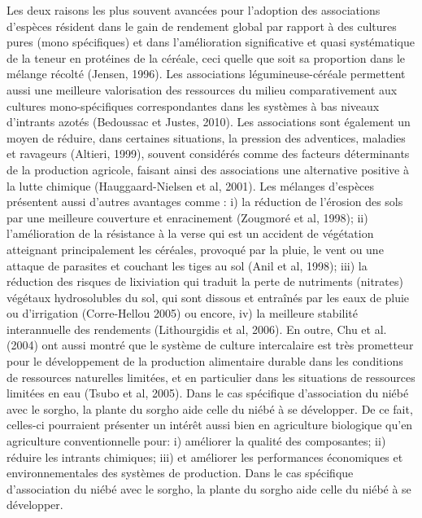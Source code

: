 \documentclass[a4paper,11pt]{article}
\begin{document}
Les deux raisons les plus souvent avancées pour l’adoption des
associations d’espèces résident dans le gain de rendement global par
rapport à des cultures pures (mono spécifiques) et dans l’amélioration
significative et quasi systématique de la teneur en protéines de la
céréale, ceci quelle que soit sa proportion dans le mélange récolté
(Jensen, 1996). Les associations légumineuse-céréale permettent aussi
une meilleure valorisation des ressources du milieu comparativement
aux cultures mono-spécifiques correspondantes dans les systèmes à bas
niveaux d’intrants azotés (Bedoussac et Justes, 2010). Les
associations sont également un moyen de réduire, dans certaines
situations, la pression des adventices, maladies et ravageurs
(Altieri, 1999), souvent considérés comme des facteurs déterminants de
la production agricole, faisant ainsi des associations une alternative
positive à la lutte chimique (Hauggaard-Nielsen et al, 2001). Les
mélanges d’espèces présentent aussi d’autres avantages comme : i) la
réduction de l’érosion des sols par une meilleure couverture et
enracinement (Zougmoré et al, 1998); ii) l’amélioration de la
résistance à la verse qui est un accident de végétation atteignant
principalement les céréales, provoqué par la pluie, le vent ou une
attaque de parasites et couchant les tiges au sol (Anil et al, 1998);
iii) la réduction des risques de lixiviation qui traduit la perte de
nutriments (nitrates) végétaux hydrosolubles du sol, qui sont dissous
et entraînés par les eaux de pluie ou d’irrigation (Corre-Hellou 2005)
ou encore, iv) la meilleure stabilité interannuelle des rendements
(Lithourgidis et al, 2006). En outre, Chu et al. (2004) ont aussi
montré que le système de culture intercalaire est très prometteur pour
le développement de la production alimentaire durable dans les
conditions de ressources naturelles limitées, et en particulier dans
les situations de ressources limitées en eau (Tsubo et al, 2005). Dans
le cas spécifique d’association du niébé avec le sorgho, la plante du
sorgho aide celle du niébé à se développer. De ce fait, celles-ci
pourraient présenter un intérêt aussi bien en agriculture biologique
qu’en agriculture conventionnelle pour: i) améliorer la qualité des
composantes; ii) réduire les intrants chimiques; iii) et améliorer les
performances économiques et environnementales des systèmes de
production\cite{Koulibi_FideleZONGO}. Dans le cas spécifique
d'association du niébé avec le sorgho, la plante du sorgho aide celle
du niébé à se développer.

\end{document}
